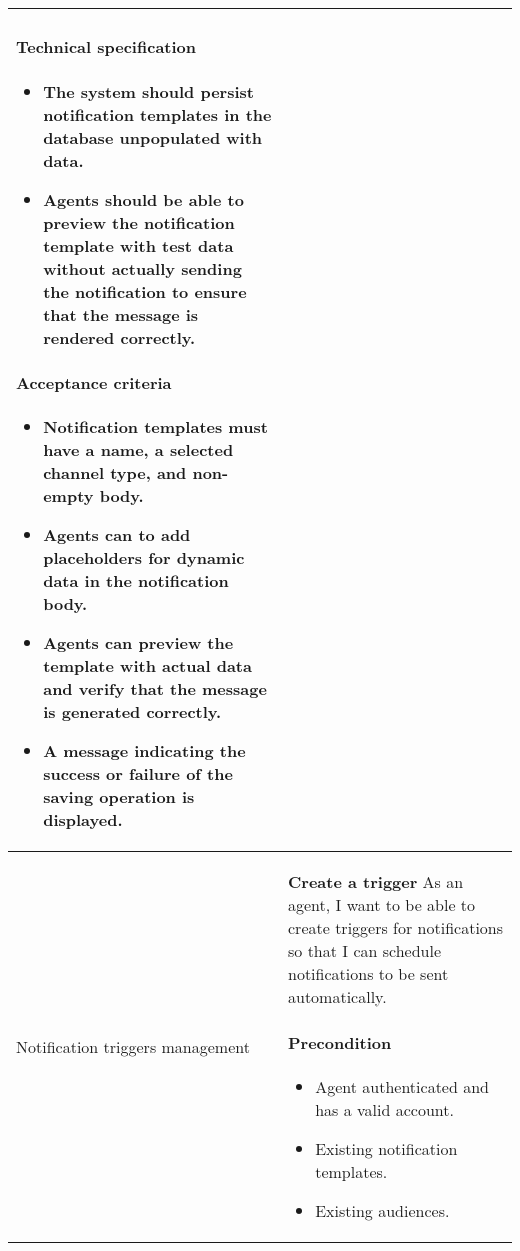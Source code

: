 \begin{longtable}{ | m{} | m{} | }
    \paragraph*{Technical specification} \mbox{} \newline
    \begin{itemize}
        \item The system should persist notification templates in the database unpopulated with data.
        \item Agents should be able to preview the notification template with test data without actually sending
              the notification to ensure that the message is rendered correctly.
    \end{itemize}
    \paragraph*{Acceptance criteria} \mbox{} \newline
    \begin{itemize}
        \item Notification templates must have a name, a selected channel type, and non-empty body.
        \item Agents can to add placeholders for dynamic data in the notification body.
        \item Agents can preview the template with actual data and verify that the message is generated correctly.
        \item A message indicating the success or failure of the saving operation is displayed.
    \end{itemize}                                                                                                                                    \\
    \hline
    Notification \newline triggers \newline management  & \textbf{Create a trigger} \newline As an agent, I want to be able to create triggers for notifications so that I can schedule notifications to be sent automatically.
    \paragraph*{Precondition} \mbox{} \newline
    \begin{itemize}
        \item Agent authenticated and has a valid account.
        \item Existing notification templates.
        \item Existing audiences.


\end{itemize}
\end{longtable}
